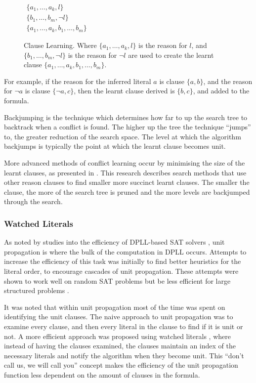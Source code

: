 \begin{figure}[htp]
\begin{center}
$\begin{array}{c}
\{a_1,\ldots,a_k, l\} \\
 \{b_1,\ldots,b_m,\neg l\}\\
\hline
\{a_1,\ldots,a_k, b_1,\ldots,b_m \}
\end{array}$
  \caption{Clause Learning. Where $\{a_1,\ldots,a_k, l\}$ is the reason for $l$, and $\{b_1,\ldots,b_m,\neg l\}$ is the reason for $\neg l$
   are used to create the learnt clause $\{a_1,\ldots,a_k, b_1,\ldots,b_m \}$.}
  \label{impl.clauselearning}
\end{center}
\end{figure}

For example, if the reason for the inferred literal $a$ is clause $\{a, b\}$, and the reason for $\neg a$ is clause $\{\neg a, c\}$,
then the learnt clause derived is $\{b,c\}$, and added to the formula.

Backjumping \citep{Gaschnig1979} is the technique which determines how far to up the search tree to backtrack when a conflict is found.
The higher up the tree the technique ``jumps'' to, the greater reduction of the search space.
The level at which the algorithm backjumps is typically the point at which the learnt clause becomes unit. 

More advanced methods of conflict learning occur by minimising the size of the learnt clauses, as presented in \citep{sorensson2009}.
This research describes search methods that use other reason clauses to find smaller more succinct learnt clauses.
The smaller the clause, the more of the search tree is pruned and the more levels are backjumped through the search.

\subsubsection{Watched Literals}
As noted by studies into the efficiency of DPLL-based SAT solvers \citep{dixon2004automating}, unit propagation is where the bulk of the computation in DPLL occurs.
Attempts to increase the efficiency of this task was initially to find better heuristics \citep{JamesMCrawford1996} for the literal order, to encourage cascades of unit propagation.
These attempts were shown to work well on random SAT problems but be less efficient for large structured problems \citep{dixon2004automating}.

It was noted that within unit propagation most of the time was spent on identifying the unit clauses.
The naive approach to unit propagation was to examine every clause, and then every literal in the clause to find if it is unit or not.
A more efficient approach was proposed using watched literals \citep{Madigan2001}, where instead of having the clauses examined, 
the clauses maintain an index of the necessary literals and notify the algorithm when they become unit.
This ``don't call us, we will call you'' concept makes the efficiency of the unit propagation function less dependent on the amount of clauses in the formula.


